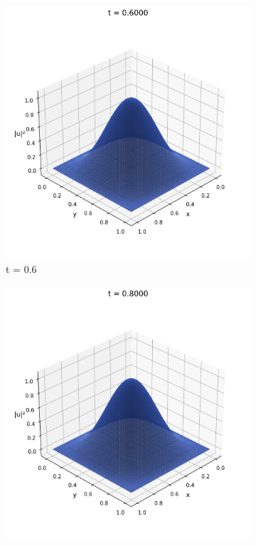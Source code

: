 \documentclass{article}
\theoremstyle{definition}
\theoremstyle{plain}
\theoremstyle{remark}
\begin{document}
\begin{figure}[h]
  \begin{subfigure}[b]{0.3\textwidth}
    \centering
    \includegraphics[width=\textwidth, trim=0cm 0cm 0cm 1cm, clip]{figures/fem_frame_0060.png}
    \caption{t = 0.6}
  \end{subfigure}
  \hfill
  \begin{subfigure}[b]{0.3\textwidth}
    \centering
    \includegraphics[width=\textwidth, trim=0cm 0cm 0cm 1cm, clip]{figures/fem_frame_0080.png}

\end{subfigure}
\end{figure}
\end{document}
